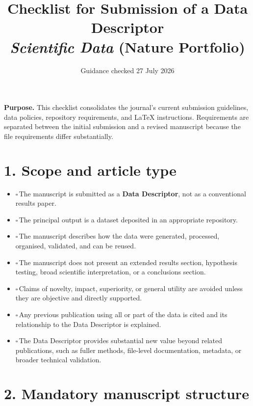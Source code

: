 \documentclass[11pt]{article}
\title{Checklist for Submission of a Data Descriptor\\
\large \textit{Scientific Data} (Nature Portfolio)}
\author{}
\date{Guidance checked 27 July 2026}
\newcommand{\cbox}{$\square$\,}
\begin{document}
\maketitle

\noindent\textbf{Purpose.} This checklist consolidates the journal's current submission guidelines, data policies, repository requirements, and LaTeX instructions. Requirements are separated between the initial submission and a revised manuscript because the file requirements differ substantially.

\section*{1. Scope and article type}

\begin{itemize}
    \item \cbox The manuscript is submitted as a \textbf{Data Descriptor}, not as a conventional results paper.
    \item \cbox The principal output is a dataset deposited in an appropriate repository.
    \item \cbox The manuscript describes how the data were generated, processed, organised, validated, and can be reused.
    \item \cbox The manuscript does not present an extended results section, hypothesis testing, broad scientific interpretation, or a conclusions section.
    \item \cbox Claims of novelty, impact, superiority, or general utility are avoided unless they are objective and directly supported.
    \item \cbox Any previous publication using all or part of the data is cited and its relationship to the Data Descriptor is explained.
    \item \cbox The Data Descriptor provides substantial new value beyond related publications, such as fuller methods, file-level documentation, metadata, or broader technical validation.
\end{itemize}

\section*{2. Mandatory manuscript structure}
\end{document}
